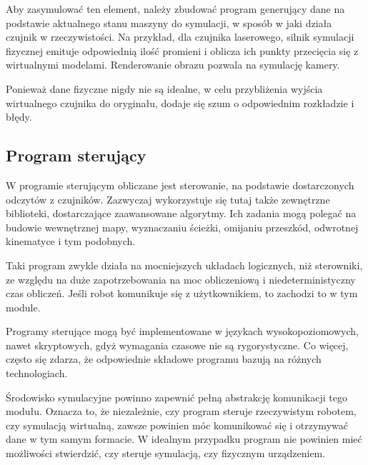 		Aby zasymulować ten element, należy zbudować program generujący dane na podstawie aktualnego stanu maszyny do symulacji, w sposób w jaki działa czujnik w rzeczywistości.
		Na przykład, dla czujnika laserowego, silnik symulacji fizycznej emituje odpowiednią ilość promieni i oblicza ich punkty przecięcia się z wirtualnymi modelami.
		Renderowanie obrazu pozwala na symulację kamery.

		Ponieważ dane fizyczne nigdy nie są idealne, w celu przybliżenia wyjścia wirtualnego czujnika do oryginału, dodaje się szum o odpowiednim rozkładzie i błędy.

	\subsection{Program sterujący}
		W programie sterującym obliczane jest sterowanie, na podstawie dostarczonych odczytów z czujników.
		Zazwyczaj wykorzystuje się tutaj także zewnętrzne biblioteki, dostarczające zaawansowane algorytmy.
		Ich zadania mogą polegać na budowie wewnętrznej mapy, wyznaczaniu ścieżki, omijaniu przeszkód, odwrotnej kinematyce i tym podobnych.

		Taki program zwykle działa na mocniejszych układach logicznych, niż sterowniki, ze względu na duże zapotrzebowania na moc obliczeniową
		i niedeterministyczny czas obliczeń.
		Jeśli robot komunikuje się z użytkownikiem, to zachodzi to w tym module. 

		Programy sterujące mogą być implementowane w językach wysokopoziomowych, nawet skryptowych, gdyż wymagania czasowe nie są rygorystyczne.
		Co więcej, często się zdarza, że odpowiednie składowe programu bazują na różnych technologiach.

		Środowisko symulacyjne powinno zapewnić pełną abstrakcję komunikacji tego modułu.
		Oznacza to, że niezależnie, czy program steruje rzeczywistym robotem, czy symulacją wirtualną, zawsze powinien móc komunikować się i otrzymywać dane w tym samym formacie.
		W idealnym przypadku program nie powinien mieć możliwości stwierdzić, czy steruje symulacją, czy fizycznym urządzeniem.
		
